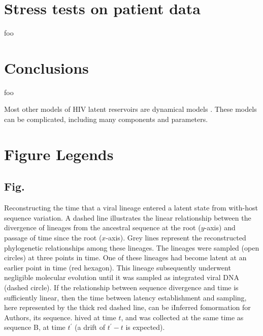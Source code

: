 \documentclass[9pt,twocolumn,twoside,lineno]{pnas-new}
\newcommand{\figcaption}[1]{\refstepcounter{figure} \subsection*{Fig. \thefigure{}} #1}
\begin{document}
\section*{Stress tests on patient data}
foo

\section*{Conclusions}
foo

Most other models of HIV latent reservoirs are dynamical models \cite{Rong09,Pace11}. These models can be complicated, including many components and parameters.

\section*{Figure Legends}
\figcaption{Reconstructing the time that a viral lineage entered a latent state from with-host sequence variation.
	A dashed line illustrates the linear relationship between the divergence of lineages from the ancestral sequence at the root ($y$-axis) and passage of time since the root ($x$-axis).
	Grey lines represent the reconstructed phylogenetic relationships among these lineages.
	The lineages were sampled (open circles) at three points in time.
	One of these lineages had become latent at an earlier point in time (red hexagon).
	This lineage subsequently underwent negligible molecular evolution until it was sampled as integrated viral DNA (dashed circle).
	If the relationship between sequence divergence and time is sufficiently linear, then the time between latency establishment and sampling, here represented by the thick red dashed line, can be iInferred fomormation for Authors, its sequence.                                                                                                                                    hived at time $t$, and was collected at the same time as sequence B, at time $t^\prime$ (a drift of $t^\prime - t$ is expected).
}
\label{fig:latenttree}
\end{document}
